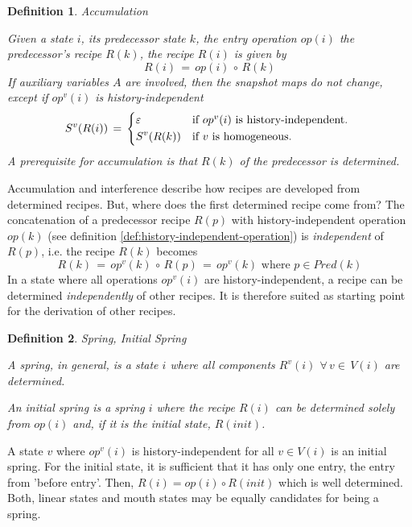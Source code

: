 \documentclass[12pt,a4paper]{scrartcl}
\newtheorem{definition}{Definition}
\begin{document}
\begin{definition} Accumulation

Given a state $i$, its predecessor state $k$, the entry operation $op(i)$
the predecessor's recipe $R(k)$, the recipe $R(i)$ is given by
\begin{equation}
       R(i)\,=\,op(i)\,\circ\,R(k)
\end{equation}
If auxiliary variables $A$ are involved, then the snapshot maps do not change,
except if $op^v(i)$ is history-independent
\begin{equation} \label{eq:accumulation-aux}
    S^v(R(i))\,=\,\begin{dcases*}
                  \varepsilon & if $op^v(i)$ is history-independent. \\
                  S^v(R(k))   & if $v$ is homogeneous.\\
                \end{dcases*}
\end{equation}
A prerequisite for accumulation is that $R(k)$ of the predecessor is 
determined.
\end{definition}
Accumulation and interference describe how recipes are developed from
determined recipes.  But, where does the first determined recipe come from?
The concatenation of a predecessor recipe $R(p)$ with history-independent operation
$op(k)$ (see definition \ref{def:history-independent-operation}) is \textit{independent}
of $R(p)$, i.e. the recipe $R(k)$ becomes
\begin{equation}
    R(k)\,=\,op^v(k)\,\circ\,R(p)\,=\,op^v(k)\,\,\mbox{where $p\in Pred(k)$}
\end{equation}
In a state where all operations $op^v(i)$ are history-independent, a recipe can be determined
\textit{independently} of other recipes. It is therefore suited as starting
point for the derivation of other recipes.
\begin{definition} Spring, Initial Spring \label{def:springs}

    A spring, in general, is a state $i$ where all components $R^v(i)$
    $\forall\,v\in\,V(i)$ are determined.
    
    An initial spring is a spring $i$ where the recipe $R(i)$ can be determined
    solely from $op(i)$ and, if it is the initial state, $R(init)$. 

\end{definition}

A state $v$ where $op^v(i)$ is history-independent for all $v\in V(i)$ is an initial
spring. For the initial state, it is sufficient that it has only one entry, the
entry from 'before entry'. Then, $R(i) = op(i)\circ R(init)$ which is well
determined.  Both, linear states and mouth states may be equally candidates for
being a spring.
\end{document}
